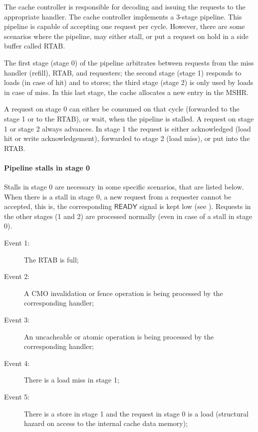 \documentclass[10pt,titlepage,twoside]{book}
\begin{document}
The cache controller is responsible for decoding and issuing the requests to the appropriate handler.
The cache controller implements a 3-stage pipeline.
This pipeline is capable of accepting one request per cycle.
However, there are some scenarios where the pipeline, may either stall, or put a request on hold in a side buffer called \acf{RTAB}.

The first stage (stage 0) of the pipeline arbitrates between requests from the miss handler (refill), \ac{RTAB}, and requesters; the second stage (stage 1) responds to loads (in case of hit) and to stores; the third stage (stage 2) is only used by loads in case of miss.
In this last stage, the cache allocates a new entry in the \ac{MSHR}.

A request on stage 0 can either be consumed on that cycle (forwarded to the stage 1 or to the \ac{RTAB}), or wait, when the pipeline is stalled.
A request on stage 1 or stage 2 always advances.
In stage 1 the request is either acknowledged (load hit or write acknowledgement), forwarded to stage 2 (load miss), or put into the \ac{RTAB}.

\paragraph{Pipeline stalls in stage 0}\mbox{}

Stalls in stage 0 are necessary in some specific scenarios, that are listed below.
When there is a stall in stage 0, a new request from a requester cannot be accepted, this is, the corresponding $\mathsf{READY}$ signal is kept low (see ).
Requests in the other stages (1 and 2) are processed normally (even in case of a stall in stage 0).

\begin{description}
\item[Event 1:] The \ac{RTAB} is full;
\item[Event 2:] A \ac{CMO} invalidation or fence operation is being processed by the corresponding handler;
\item[Event 3:] An uncacheable or atomic operation is being processed by the corresponding handler;
\item[Event 4:] There is a load miss in stage 1;
\item[Event 5:] There is a store in stage 1 and the request in stage 0 is a load (structural hazard on access to the internal cache data memory);
\end{description}
\end{document}
